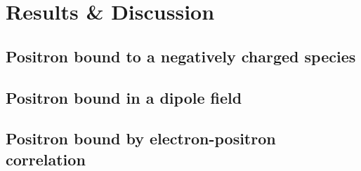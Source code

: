 \section{Results \& Discussion}

\subsection{Positron bound to a negatively charged species}

\subsection{Positron bound in a dipole field}


\subsection{Positron bound by electron-positron correlation}
